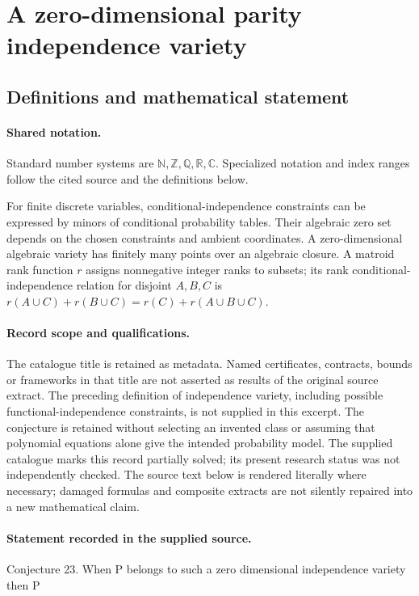 \documentclass[11pt]{article}
\begin{document}
\section{A zero-dimensional parity independence variety}\label{statement}

\subsection{Definitions and mathematical statement}

\paragraph{Shared notation.}Standard number systems are $\mathbb N,\mathbb Z,\mathbb Q,\mathbb R,\mathbb C$. Specialized notation and index ranges follow the cited source and the definitions below.


For finite discrete variables, conditional-independence constraints can be expressed by minors of conditional probability tables. Their algebraic zero set depends on the chosen constraints and ambient coordinates. A zero-dimensional algebraic variety has finitely many points over an algebraic closure. A matroid rank function $r$ assigns nonnegative integer ranks to subsets; its rank conditional-independence relation for disjoint $A,B,C$ is $r(A\cup C)+r(B\cup C)=r(C)+r(A\cup B\cup C)$.
\paragraph{Record scope and qualifications.}
The catalogue title is retained as metadata. Named certificates, contracts, bounds or frameworks in that title are not asserted as results of the original source extract.
The preceding definition of independence variety, including possible functional-independence constraints, is not supplied in this excerpt. The conjecture is retained without selecting an invented class or assuming that polynomial equations alone give the intended probability model. The supplied catalogue marks this record partially solved; its present research status was not independently checked.
The source text below is rendered literally where necessary; damaged formulas and composite extracts are not silently repaired into a new mathematical claim.
\paragraph{Statement recorded in the supplied source.}
Conjecture 23. When P belongs to such a zero dimensional independence variety then P
\end{document}
